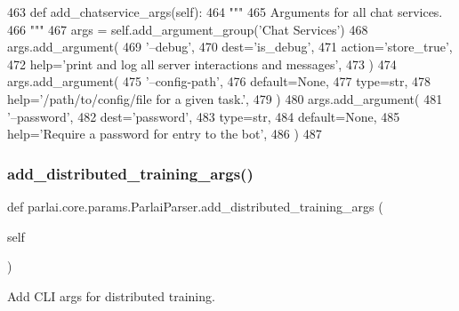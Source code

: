\begin{DoxyCode}
463     \textcolor{keyword}{def }add\_chatservice\_args(self):
464         \textcolor{stringliteral}{"""}
465 \textcolor{stringliteral}{        Arguments for all chat services.}
466 \textcolor{stringliteral}{        """}
467         args = self.add\_argument\_group(\textcolor{stringliteral}{'Chat Services'})
468         args.add\_argument(
469             \textcolor{stringliteral}{'--debug'},
470             dest=\textcolor{stringliteral}{'is\_debug'},
471             action=\textcolor{stringliteral}{'store\_true'},
472             help=\textcolor{stringliteral}{'print and log all server interactions and messages'},
473         )
474         args.add\_argument(
475             \textcolor{stringliteral}{'--config-path'},
476             default=\textcolor{keywordtype}{None},
477             type=str,
478             help=\textcolor{stringliteral}{'/path/to/config/file for a given task.'},
479         )
480         args.add\_argument(
481             \textcolor{stringliteral}{'--password'},
482             dest=\textcolor{stringliteral}{'password'},
483             type=str,
484             default=\textcolor{keywordtype}{None},
485             help=\textcolor{stringliteral}{'Require a password for entry to the bot'},
486         )
487 
\end{DoxyCode}
\mbox{\label{classparlai_1_1core_1_1params_1_1ParlaiParser_a718f9802eec8bcac25866900d2ae69b0}} 
\subsubsection{\texorpdfstring{add\+\_\+distributed\+\_\+training\+\_\+args()}{add\_distributed\_training\_args()}}
{\footnotesize\ttfamily def parlai.\+core.\+params.\+Parlai\+Parser.\+add\+\_\+distributed\+\_\+training\+\_\+args (\begin{DoxyParamCaption}\item[{}]{self }\end{DoxyParamCaption})}

\begin{DoxyVerb}Add CLI args for distributed training.
\end{DoxyVerb}
 

